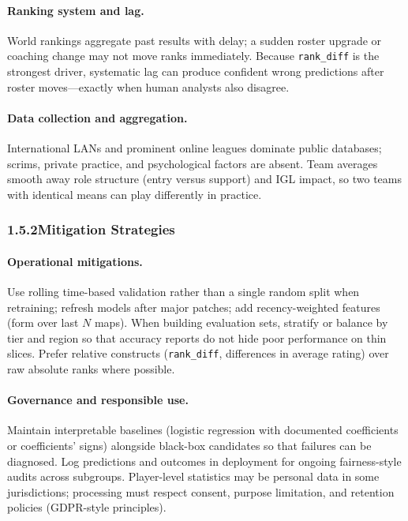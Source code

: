 \documentclass[12pt,a4paper]{article}
\begin{document}
\paragraph{Ranking system and lag.}
World rankings aggregate past results with delay; a sudden roster upgrade or coaching change may not move ranks immediately. Because \texttt{rank\_diff} is the strongest driver, systematic lag can produce confident wrong predictions after roster moves---exactly when human analysts also disagree.

\paragraph{Data collection and aggregation.}
International LANs and prominent online leagues dominate public databases; scrims, private practice, and psychological factors are absent. Team averages smooth away role structure (entry versus support) and IGL impact, so two teams with identical means can play differently in practice.

\subsubsection{1.5.2\quad Mitigation Strategies}

\paragraph{Operational mitigations.}
Use rolling time-based validation rather than a single random split when retraining; refresh models after major patches; add recency-weighted features (form over last $N$ maps). When building evaluation sets, stratify or balance by tier and region so that accuracy reports do not hide poor performance on thin slices. Prefer relative constructs (\texttt{rank\_diff}, differences in average rating) over raw absolute ranks where possible.

\paragraph{Governance and responsible use.}
Maintain interpretable baselines (logistic regression with documented coefficients or coefficients' signs) alongside black-box candidates so that failures can be diagnosed. Log predictions and outcomes in deployment for ongoing fairness-style audits across subgroups. Player-level statistics may be personal data in some jurisdictions; processing must respect consent, purpose limitation, and retention policies (GDPR-style principles).
\end{document}
